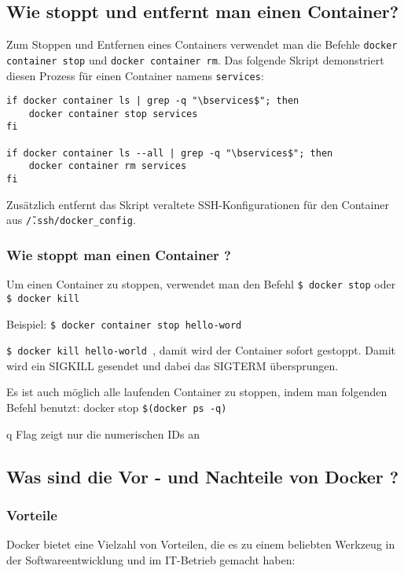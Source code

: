\subsection{Wie stoppt und entfernt man einen Container?}

Zum Stoppen und Entfernen eines Containers verwendet man die Befehle \texttt{docker container stop} und \texttt{docker container rm}. Das folgende Skript demonstriert diesen Prozess für einen Container namens \texttt{services}:

\begin{verbatim}
if docker container ls | grep -q "\bservices$"; then
    docker container stop services
fi

if docker container ls --all | grep -q "\bservices$"; then
    docker container rm services
fi
\end{verbatim}

Zusätzlich entfernt das Skript veraltete SSH-Konfigurationen für den Container aus \texttt{\~/.ssh/docker\_config}.

\subsubsection {Wie stoppt man einen Container ? }

Um einen Container zu stoppen, verwendet man den Befehl \texttt{\$ docker stop} oder \texttt{\$ docker kill}

Beispiel:  \texttt{\$ docker container stop hello-word}

\texttt{\$ docker kill hello-world },  damit wird der Container sofort gestoppt. Damit wird ein SIGKILL gesendet und dabei das SIGTERM übersprungen.

Es ist auch möglich alle laufenden Container zu stoppen, indem man folgenden Befehl benutzt:
docker stop \texttt{\$(docker ps -q)}


q Flag zeigt nur die numerischen IDs an

\subsection{Was sind die Vor - und Nachteile von Docker ? }

\subsubsection{Vorteile}

Docker bietet eine Vielzahl von Vorteilen, die es zu einem beliebten Werkzeug in der Softwareentwicklung und im IT-Betrieb gemacht haben:

